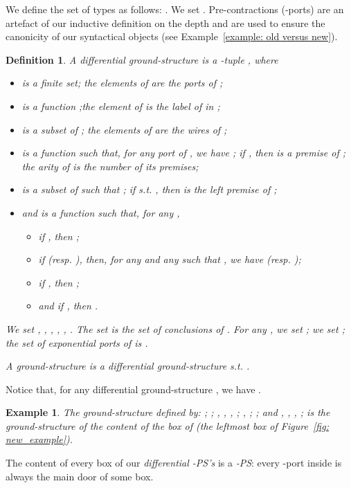\documentclass{article}
\theoremstyle{plain}
\newtheorem{definition}{Definition}
\newtheorem{example}{Example}
\begin{document}
We define the set  of types as follows: . We set    . Pre-contractions (-ports) are an artefact of our inductive definition on the depth and are used to ensure the canonicity of our syntactical objects (see Example~\ref{example: old versus new}).


\begin{definition}\label{defin: diff ground-structure}
A \emph{differential ground-structure} is a -tuple , where
\begin{itemize}
\item  is a finite set; the elements of  are the \emph{ports of };
\item  is a function ;the element  of  is the \emph{label of  in };
\item  is a subset of ; the elements of  are the \emph{wires of };
\item  is a function  such that, for any port  of , we have     ; 
if , then  is a \emph{premise of }; the \emph{arity  of } is the number of its premises;
\item  is a subset of  such that    ; if  s.t. , then  is \emph{the left premise of ;}
\item and  is a function  such that, for any ,
\begin{itemize}
\item if , then ;
\item if  (resp. ), then, for any  and any  such that , we have  (resp. );
\item if , then ;
\item and if , then .
\end{itemize}
\end{itemize}
We set , , , , , . The set  is the set of \emph{conclusions of }. For any , we set ; we set ; the set  of \emph{exponential ports of } is . 

A \emph{ground-structure} is a differential ground-structure  s.t. .
\end{definition}

Notice that, for any differential ground-structure , we have .

\begin{example}
The ground-structure  defined by: 
 ; 
; 
, , , ; 
, ; 
; 
and , , , ; 
is the ground-structure of the content of the box  of  (the leftmost box of Figure~\ref{fig: new_example}).
\end{example}


The content of every box of our \emph{differential -PS's} is a \emph{-PS}: every -port inside is always the main door of some box.
\end{document}
